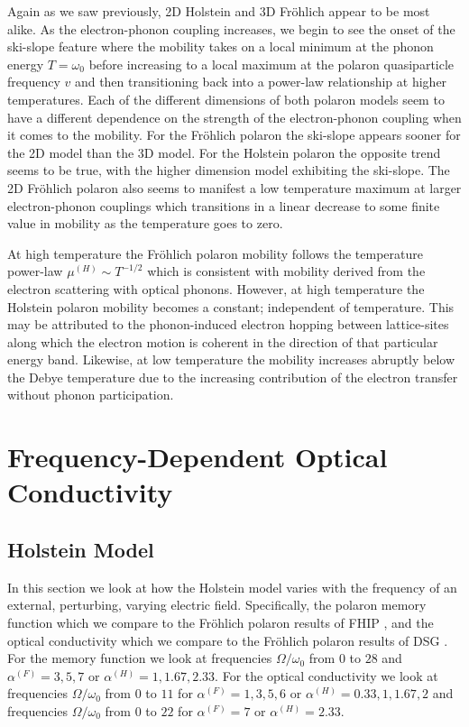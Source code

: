 Again as we saw previously, 2D Holstein and 3D Fr\"ohlich appear to be most alike. As the electron-phonon coupling increases, we begin to see the onset of the ski-slope feature where the mobility takes on a local minimum at the phonon energy $T = \omega_0$ before increasing to a local maximum at the polaron quasiparticle frequency $v$ and then transitioning back into a power-law relationship at higher temperatures. Each of the different dimensions of both polaron models seem to have a different dependence on the strength of the electron-phonon coupling when it comes to the mobility. For the Fr\"ohlich polaron the ski-slope appears sooner for the 2D model than the 3D model. For the Holstein polaron the opposite trend seems to be true, with the higher dimension model exhibiting the ski-slope. The 2D Fr\"ohlich polaron also seems to manifest a low temperature maximum at larger electron-phonon couplings which transitions in a linear decrease to some finite value in mobility as the temperature goes to zero.
\newline

At high temperature the Fr\"ohlich polaron mobility follows the temperature power-law $\mu^{(H)} \sim T^{-1/2}$ which is consistent with mobility derived from the electron scattering with optical phonons. However, at high temperature the Holstein polaron mobility becomes a constant; independent of temperature. This may be attributed to the phonon-induced electron hopping between lattice-sites along which the electron motion is coherent in the direction of that particular energy band. Likewise, at low temperature the mobility increases abruptly below the Debye temperature due to the increasing contribution of the electron transfer without phonon participation.

\section{Frequency-Dependent Optical Conductivity}
\label{sec:5-2}

\subsection{Holstein Model}
\label{subsec:5-2-1}

In this section we look at how the Holstein model varies with the frequency of an external, perturbing, varying electric field. Specifically, the polaron memory function which we compare to the Fr\"ohlich polaron results of FHIP \cite{Feynman1962}, and the optical conductivity which we compare to the Fr\"ohlich polaron results of DSG \cite{Devreese1972}. For the memory function we look at frequencies $\Omega / \omega_0$ from $0$ to $28$ and $\alpha^{(F)} = 3, 5, 7$ or $\alpha^{(H)} = 1, 1.67, 2.33$. For the optical conductivity we look at frequencies $\Omega / \omega_0$ from $0$ to $11$ for $\alpha^{(F)} = 1, 3, 5, 6$ or $\alpha^{(H)} = 0.33, 1, 1.67, 2$ and frequencies $\Omega / \omega_0$ from $0$ to $22$ for $\alpha^{(F)} = 7$ or $\alpha^{(H)} = 2.33$. 

